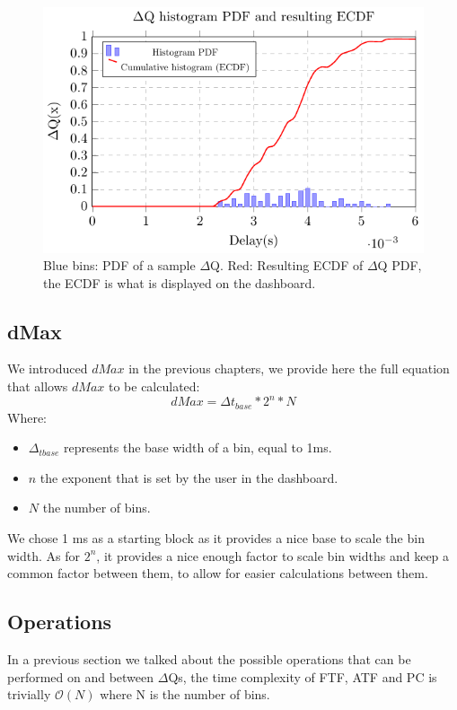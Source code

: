     \begin{figure}[H]
            \begin{center}
                \includegraphics[scale=1]{tikz/pdf_dq.pdf} 
            \end{center}
            \caption{Blue bins: PDF of a sample $\Delta$Q. Red: Resulting ECDF of $\Delta$Q PDF, the ECDF is what is displayed on the dashboard.}
        \end{figure}

    \subsection{dMax}
        We introduced $dMax$ in the previous chapters, we provide here the full equation that allows $dMax$ to be calculated:
        \begin{equation}
            dMax = \Delta t_{base} * 2^n * N  
            \label{eq:dMaxU}
        \end{equation}
        Where:
        \begin{itemize}
            \item $\Delta_{t base}$ represents the base width of a bin, equal to 1ms.
            \item $n$ the exponent that is set by the user in the dashboard.
            \item $N$ the number of bins.
        \end{itemize}
        We chose 1 ms as a starting block as it provides a nice base to scale the bin width. As for $2^n$, it provides a nice enough factor to scale bin widths and keep a common factor between them, to allow for easier calculations between them.
      \subsection{Operations}
    In a previous section we talked about the possible operations that can be performed on and between $\Delta$Qs, the time complexity of FTF, ATF and PC is trivially $\mathcal{O}(N)$ where N is the number of bins.
    
